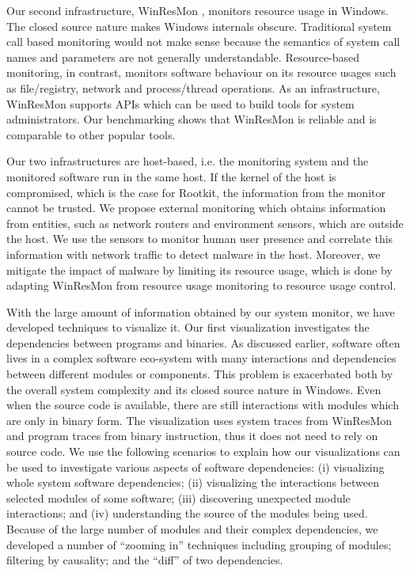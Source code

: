 Our second infrastructure, WinResMon \cite{ramnath2006winresmon},
monitors resource usage in Windows.
The closed source nature makes Windows internals obscure.
Traditional system call based monitoring would not make sense
because the semantics of system call names and parameters are not
generally understandable.
Resource-based monitoring, in contrast,
monitors software behaviour on its resource usages such as
file/registry, network and process/thread operations.
As an infrastructure, WinResMon supports APIs which
can be used to build tools for system administrators.
Our benchmarking shows that WinResMon is reliable and
is comparable to other popular tools.

Our two infrastructures are host-based, i.e.
the monitoring system and the monitored software run in the same host.
If the kernel of the host is compromised,
which is the case for Rootkit,
the information from the monitor cannot be trusted.
We propose external monitoring \cite{chang2010enhancing} which obtains information from entities,
such as network routers and environment sensors, which are outside the host.
We use the sensors to monitor human user presence and correlate
this information with network traffic to detect malware in the host.
Moreover, we mitigate the impact of malware by limiting its resource usage,
which is done by adapting WinResMon from resource usage monitoring to
resource usage control.

With the large amount of information obtained by our system monitor,
we have developed techniques to visualize it.
Our first visualization \cite{wu2010comprehending} investigates the
dependencies between programs and binaries.
As discussed earlier,
software often lives in a complex software eco-system
with many interactions and dependencies between different
modules or components.
This problem is exacerbated both by the
overall system complexity and its closed source nature in Windows.
Even when the source code is available, there are still interactions with
modules which are only in binary form.
The visualization uses system traces from WinResMon and
program traces from binary instruction,
thus it does not need to rely on source code.
We use the following scenarios to explain how our visualizations can
be used to investigate various aspects of software dependencies:
(i) visualizing whole system software dependencies;
(ii) visualizing the interactions between selected modules of some software;
(iii) discovering unexpected module interactions;
and (iv) understanding the source of the modules being used.
Because of the large number of modules and their complex dependencies,
we developed a number of ``zooming in'' techniques including
grouping of modules;
filtering by causality; and
the ``diff'' of two dependencies.

